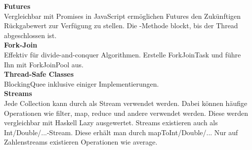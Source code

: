 \textbf{Futures}\\
Vergleichbar mit Promises in JavaScript ermöglichen Futures den Zukünftigen Rückgabewert zur Verfügung zu stellen.
Die -Methode blockt, bis der Thread abgeschlossen ist.\\

\textbf{Fork-Join}\\
Effektiv für divide-and-conquer Algorithmen. Erstelle ForkJoinTask und führe Ihn mit ForkJoinPool aus.\\

\textbf{Thread-Safe Classes}\\
BlockingQuee inklusive einiger Implementierungen.\\

\textbf{Streams}\\
Jede Collection kann durch  als Stream verwendet werden.
Dabei können häufige Operationen wie filter, map, reduce und andere verwendet werden.
Diese werden vergleichbar mit Haskell Lazy ausgewertet.
Streams existieren auch als Int/Double/...-Stream. Diese erhält man durch mapToInt/Double/...
Nur auf Zahlenstreams existieren Operationen wie average.

\newpage
